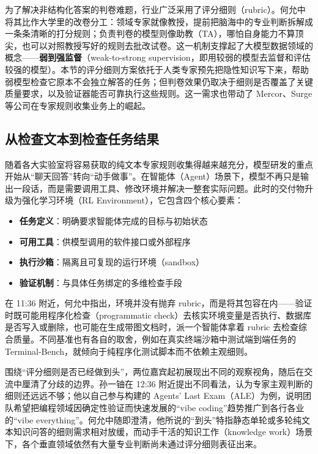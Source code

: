 \documentclass[UTF8,a4paper,11pt,fontset=fandol]{ctexart}
\begin{document}
为了解决非结构化答案的判卷难题，行业广泛采用了评分细则（rubric）。何允中将其比作大学里的改卷分工：领域专家就像教授，提前把脑海中的专业判断拆解成一条条清晰的打分规则；负责判卷的模型则像助教（TA），哪怕自身能力不算顶尖，也可以对照教授写好的规则去批改试卷。这一机制支撑起了大模型数据领域的概念——\textbf{弱到强监督}（weak-to-strong supervision，即用较弱的模型去监督和评估较强的模型）。本节的评分细则方案依托于人类专家预先把隐性知识写下来，帮助弱模型检查它原本不会独立解答的任务；但判卷效果仍取决于细则是否覆盖了关键质量要求，以及验证器能否可靠执行这些规则。这一需求也带动了 Mercor、Surge 等公司在专家规则收集业务上的崛起。

\subsection{从检查文本到检查任务结果}
随着各大实验室将容易获取的纯文本专家规则收集得越来越充分，模型研发的重点开始从“聊天回答”转向“动手做事”。在智能体（Agent）场景下，模型不再只是输出一段话，而是需要调用工具、修改环境并解决一整套实际问题。此时的交付物升级为强化学习环境（RL Environment），它包含四个核心要素：
\begin{itemize}
\item \textbf{任务定义}：明确要求智能体完成的目标与初始状态
\item \textbf{可用工具}：供模型调用的软件接口或外部程序
\item \textbf{执行沙箱}：隔离且可复现的运行环境（sandbox）
\item \textbf{验证机制}：与具体任务绑定的多维检查手段
\end{itemize}
在 11:36 附近，何允中指出，环境并没有抛弃 rubric，而是将其包容在内——验证时既可能用程序化检查（programmatic check）去核实环境变量是否执行、数据库是否写入或删除，也可能在生成带图文档时，派一个智能体拿着 rubric 去检查综合质量。不同基准也有各自的取舍，例如在真实终端沙箱中测试端到端任务的 Terminal-Bench，就倾向于纯程序化测试脚本而不依赖主观细则。

围绕“评分细则是否已经做到头”，两位嘉宾起初展现出不同的观察视角，随后在交流中厘清了分歧的边界。孙一铀在 12:36 附近提出不同看法，认为专家主观判断的细则还远远不够；他以自己参与构建的 Agents' Last Exam（ALE）为例，说明团队希望把编程领域因确定性验证而快速发展的“vibe coding”趋势推广到各行各业的“vibe everything”。何允中随即澄清，他所说的“到头”特指静态单轮或多轮纯文本知识问答的细则需求相对放缓，而动手干活的知识工作（knowledge work）场景下，各个垂直领域依然有大量专业判断尚未通过评分细则表征出来。
\end{document}
